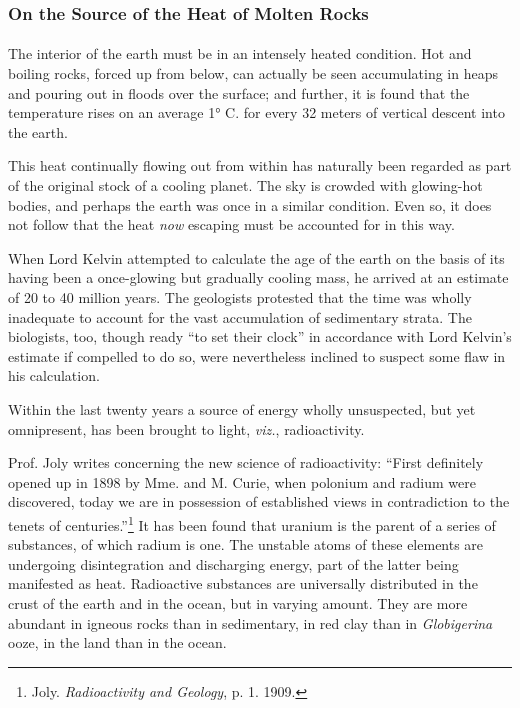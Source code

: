 \documentclass[a4paper, 12pt, oneside]{article}
\begin{document}
\subsubsection{On the Source of the Heat of Molten Rocks}
\paragraph{}
The interior of the earth must be in an intensely heated condition. Hot and boiling rocks, forced up from below, can actually be seen accumulating in heaps and pouring out in floods over the surface; and further, it is found that the temperature rises on an average 1° C. for every 32 meters of vertical descent into the earth.

This heat continually flowing out from within has naturally been regarded as part of the original stock of a cooling planet. The sky is crowded with glowing-hot bodies, and perhaps the earth was once in a similar condition. Even so, it does not follow that the heat \emph{now} escaping must be accounted for in this way.

When Lord Kelvin attempted to calculate the age of the earth on the basis of its having been a once-glowing but gradually cooling mass, he arrived at an estimate of 20 to 40 million years. The geologists protested that the time was wholly inadequate to account for the vast accumulation of sedimentary strata. The biologists, too, though ready ``to set their clock'' in accordance with Lord Kelvin's estimate if compelled to do so, were nevertheless inclined to suspect some flaw in his calculation.

Within the last twenty years a source of energy wholly unsuspected, but yet omnipresent, has been brought to light, \emph{viz.}, radioactivity.

Prof. Joly writes concerning the new science of radioactivity: ``First definitely opened up in 1898 by Mme. and M. Curie, when polonium and radium were discovered, today we are in possession of established views in contradiction to the tenets of centuries.''\footnote{Joly. \emph{Radioactivity and Geology}, p. 1. 1909.} It has been found that uranium is the parent of a series of substances, of which radium is one. The unstable atoms of these elements are undergoing disintegration and discharging energy, part of the latter being manifested as heat. Radioactive substances are universally distributed in the crust of the earth and in the ocean, but in varying amount. They are more abundant in igneous rocks than in sedimentary, in red clay than in \emph{Globigerina} ooze, in the land than in the ocean.
\end{document}
